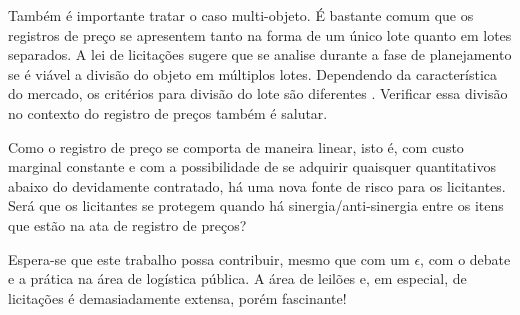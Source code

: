 Também é importante tratar o caso multi-objeto. É bastante comum que os registros de preço se apresentem tanto na forma de um único lote quanto em lotes separados. A lei de licitações sugere que se analise durante a fase de planejamento se é viável a divisão do objeto em múltiplos lotes. Dependendo da característica do mercado, os critérios para divisão do lote são diferentes \citet{pellegrini2018:MSc}. Verificar essa divisão no contexto do registro de preços também é salutar.

Como o registro de preço se comporta de maneira linear, isto é, com custo marginal constante e com a possibilidade de se adquirir quaisquer quantitativos abaixo do devidamente contratado, há uma nova fonte de risco para os licitantes. Será que os licitantes se protegem quando há sinergia/anti-sinergia entre os itens que estão na ata de registro de preços?

Espera-se que este trabalho possa contribuir, mesmo que com um $\epsilon$, com o debate e a prática na área de logística pública. A área de leilões e, em especial, de licitações é demasiadamente extensa, porém fascinante!